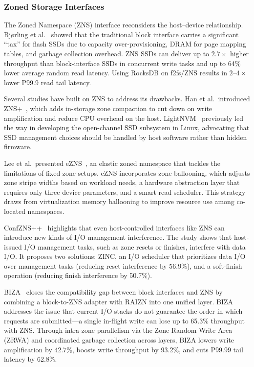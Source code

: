 \documentclass[conference]{IEEEtran}
\begin{document}
\subsubsection{Zoned Storage Interfaces}
\label{sec:zns}

The Zoned Namespace (ZNS) interface reconsiders the host--device relationship. Bj{\o}rling et al.~\cite{bjorling2021zns} showed that the traditional block interface carries a significant ``tax'' for flash SSDs due to capacity over-provisioning, DRAM for page mapping tables, and garbage collection overhead. ZNS SSDs can deliver up to $2.7\times$ higher throughput than block-interface SSDs in concurrent write tasks and up to 64\% lower average random read latency. Using RocksDB on f2fs/ZNS results in $2$--$4\times$ lower P99.9 read tail latency.

Several studies have built on ZNS to address its drawbacks. Han et al.\ introduced ZNS+~\cite{han2021znsplus}, which adds in-storage zone compaction to cut down on write amplification and reduce CPU overhead on the host. LightNVM~\cite{bjorling2017lightnvm} previously led the way in developing the open-channel SSD subsystem in Linux, advocating that SSD management choices should be handled by host software rather than hidden firmware.

Lee et al.\ presented eZNS~\cite{lee2023ezns}, an elastic zoned namespace that tackles the limitations of fixed zone setups. eZNS incorporates zone ballooning, which adjusts zone stripe widths based on workload needs, a hardware abstraction layer that requires only three device parameters, and a smart read scheduler. This strategy draws from virtualization memory ballooning to improve resource use among co-located namespaces.

ConfZNS++~\cite{park2024confznspp} highlights that even host-controlled interfaces like ZNS can introduce new kinds of I/O management interference. The study shows that host-issued I/O management tasks, such as zone resets or finishes, interfere with data I/O. It proposes two solutions: ZINC, an I/O scheduler that prioritizes data I/O over management tasks (reducing reset interference by 56.9\%), and a soft-finish operation (reducing finish interference by 50.7\%).

BIZA~\cite{chen2024biza} closes the compatibility gap between block interfaces and ZNS by combining a block-to-ZNS adapter with RAIZN into one unified layer. BIZA addresses the issue that current I/O stacks do not guarantee the order in which requests are submitted---a single in-flight write can lose up to 65.3\% throughput with ZNS. Through intra-zone parallelism via the Zone Random Write Area (ZRWA) and coordinated garbage collection across layers, BIZA lowers write amplification by 42.7\%, boosts write throughput by 93.2\%, and cuts P99.99 tail latency by 62.8\%.
\end{document}
